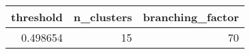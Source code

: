 \begin{tabular}{rrr}
\toprule
threshold & n_clusters & branching_factor \\
\midrule
0.498654 & 15 & 70 \\
\bottomrule
\end{tabular}

